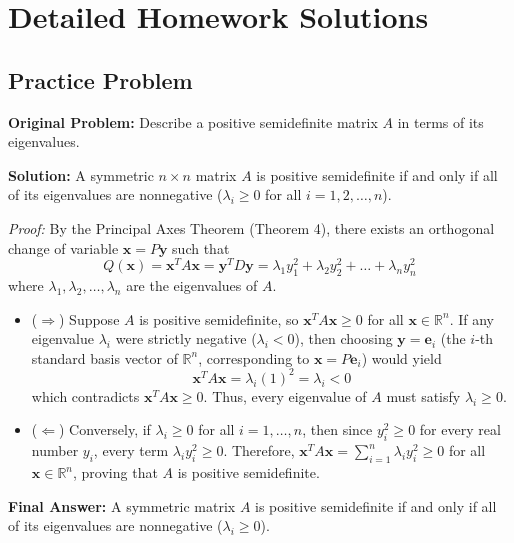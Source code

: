 \documentclass[11pt, letterpaper]{article}
\theoremstyle{definition}
\theoremstyle{remark}
\begin{document}
\newpage
\section{Detailed Homework Solutions}

\subsection*{Practice Problem}
\textbf{Original Problem:} Describe a positive semidefinite matrix $A$ in terms of its eigenvalues.

\textbf{Solution:}
A symmetric $n \times n$ matrix $A$ is positive semidefinite if and only if all of its eigenvalues are nonnegative ($\lambda_i \ge 0$ for all $i = 1, 2, \dots, n$).

\textit{Proof:} By the Principal Axes Theorem (Theorem 4), there exists an orthogonal change of variable $\mathbf{x} = P\mathbf{y}$ such that
\[
Q(\mathbf{x}) = \mathbf{x}^T A \mathbf{x} = \mathbf{y}^T D \mathbf{y} = \lambda_1 y_1^2 + \lambda_2 y_2^2 + \dots + \lambda_n y_n^2
\]
where $\lambda_1, \lambda_2, \dots, \lambda_n$ are the eigenvalues of $A$.
\begin{itemize}
    \item ($\Rightarrow$) Suppose $A$ is positive semidefinite, so $\mathbf{x}^T A \mathbf{x} \ge 0$ for all $\mathbf{x} \in \mathbb{R}^n$. If any eigenvalue $\lambda_i$ were strictly negative ($\lambda_i < 0$), then choosing $\mathbf{y} = \mathbf{e}_i$ (the $i$-th standard basis vector of $\mathbb{R}^n$, corresponding to $\mathbf{x} = P\mathbf{e}_i$) would yield
    \[
    \mathbf{x}^T A \mathbf{x} = \lambda_i (1)^2 = \lambda_i < 0
    \]
    which contradicts $\mathbf{x}^T A \mathbf{x} \ge 0$. Thus, every eigenvalue of $A$ must satisfy $\lambda_i \ge 0$.
    \item ($\Leftarrow$) Conversely, if $\lambda_i \ge 0$ for all $i = 1, \dots, n$, then since $y_i^2 \ge 0$ for every real number $y_i$, every term $\lambda_i y_i^2 \ge 0$. Therefore, $\mathbf{x}^T A \mathbf{x} = \sum_{i=1}^n \lambda_i y_i^2 \ge 0$ for all $\mathbf{x} \in \mathbb{R}^n$, proving that $A$ is positive semidefinite.
\end{itemize}
\textbf{Final Answer:} A symmetric matrix $A$ is positive semidefinite if and only if all of its eigenvalues are nonnegative ($\lambda_i \ge 0$).
\end{document}
